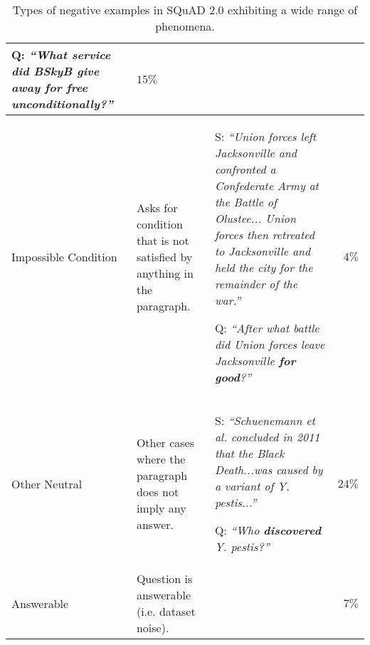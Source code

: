 \documentclass{article}
\begin{document}
\begin{table}[h]
\begin{tabular}{| L{2cm} L{3.7cm} L{7.818cm} r |}
        Q: \textit{“What service did BSkyB \textbf{give away for free
        unconditionally}?”}
        & $15\%$\\
        \hline
        \begin{center}
        Impossible
        Condition
        \end{center}
        & Asks for condition that
        is not satisfied by
        anything in the paragraph.
        & S: \textit{“Union forces left Jacksonville and confronted
        a Confederate Army at the Battle of Olustee...
        Union forces then retreated to Jacksonville
        and held the city for the remainder of the war.”}\par
        Q: \textit{“After what battle did Union forces leave
        Jacksonville \textbf{for good}?”}
        & $4\%$\\
        \hline
        \begin{center}
        Other
        Neutral
        \end{center}
        & Other cases where the
        paragraph does not imply
        any answer.
        & S: \textit{“Schuenemann et al. concluded in 2011 that the
        Black Death...was caused by a variant of Y. pestis...”}\par
        Q: \textit{“Who \textbf{discovered} Y. pestis?”}
        & $24\%$\\
        \hline
        \vspace{0.03cm}Answerable
        & Question is answerable
        (i.e. dataset noise).
        & 
        & $7\%$\\
        \hline
    \end{tabular}
    \caption{Types of negative examples in SQuAD 2.0 exhibiting a wide range of phenomena.}
    \label{tab:table_1}
\end{table}
\end{document}
